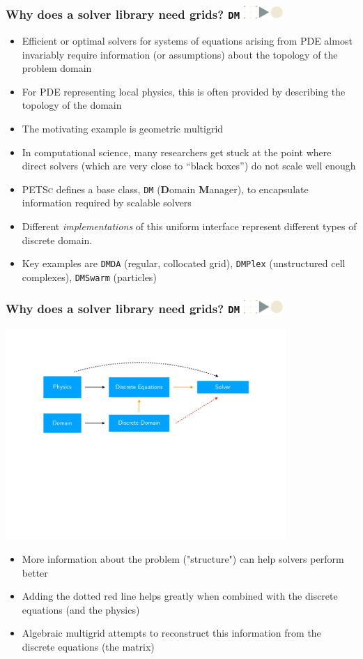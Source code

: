 \documentclass{beamer}
\newcommand\frametitlelogo[1]{\frametitle{#1\hspace{0pt plus 1 filll} \includegraphics[width=42pt]{logo_slides}}}
\newcommand{\PETSc}{\textsc{PETSc}}
\begin{document}
\begin{frame}[fragile]
  \frametitlelogo{Why does a solver library need grids? \texttt{DM}}
  \begin{itemize}
    \item Efficient or optimal solvers for systems of equations arising from PDE almost invariably require information  (or assumptions) about the topology of the problem domain
    \item For PDE representing local physics, this is often provided by describing the topology of the domain
      \item The motivating example is geometric multigrid
      \item In computational science, many researchers get stuck at the point where direct solvers (which are very close to ``black boxes'') do not scale well enough
      \item \PETSc{} defines a base class, \texttt{DM} (\textbf{D}omain \textbf{M}anager), to encapsulate information required by scalable solvers
      \item Different \emph{implementations} of this uniform interface represent different types of discrete domain.
      \item Key examples are \texttt{DMDA} (regular, collocated grid), \texttt{DMPlex} (unstructured cell complexes), \texttt{DMSwarm} (particles)
  \end{itemize}
\end{frame}

\begin{frame}[fragile]
  \frametitlelogo{Why does a solver library need grids? \texttt{DM}}
  \includegraphics[width=0.8\textwidth]{images/need_for_dm.pdf}
  \begin{itemize}
    \item More information about the problem ("structure") can help solvers perform better
    \item Adding the dotted red line helps greatly when combined with the discrete equations (and the physics)
    \item Algebraic multigrid attempts to reconstruct this information from the discrete equations (the matrix)
  \end{itemize}
\end{frame}
\end{document}
